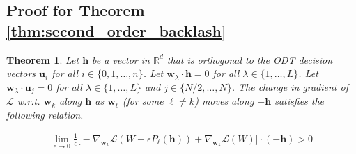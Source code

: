 \documentclass{article}
\theoremstyle{plain}
\newtheorem*{theorem*}{Theorem}
\theoremstyle{definition}
\theoremstyle{remark}
\newcommand{\R}{{\mathbb R}}
\newcommand{\E}{{\mathbf E}}
\newcommand{\1}{{\mathbf 1}}
\newcommand{\0}{{\mathbf 0}}
\newcommand{\h}{{\mathbf h}}
\newcommand{\w}{{\mathbf w}}
\newcommand{\x}{{\mathbf x}}
\newcommand{\bu}{{\mathbf u}}
\renewcommand{\>}{{\rightarrow}}
\begin{document}
\subsection{Proof for Theorem \ref{thm:second_order_backlash}}
\label{app:second_order_backlash}
\begin{theorem*}
Let $\h$ be a vector in $\R^d$ that is orthogonal to the ODT decision vectors $\bu_i$ for all $i \in \{0,1,\ldots,n\}$. 
Let $\w_\lambda \cdot \h = 0$ for all $\lambda \in\{1,\ldots,L\}$. Let $\w_\lambda \cdot \bu_j = 0$ for all $\lambda \in\{1,\ldots,L\}$ and $j \in \{N/2,\ldots, N\}$. The change in gradient of $\mathcal{L}$ w.r.t. $\w_k$ along $\h$  as $\w_\ell$ (for some $\ell \neq k$) moves along $-\h$ satisfies the following relation.

\begin{align*}
\lim_{\epsilon \to 0} \frac{1}{\epsilon} \bigg[ 
 -\nabla_{\w_k} \mathcal{L}(W + \epsilon P_\ell(\h))  
 + \nabla_{\w_k} \mathcal{L}(W)  \bigg]\cdot (-\h) > 0
\end{align*}
\end{theorem*}
\end{document}
